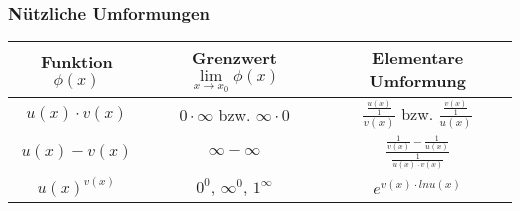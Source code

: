 \subsubsection*{Nützliche Umformungen}
\renewcommand{\arraystretch}{3}
\begin{tabular}{|c|c|c|}
\hline 
\rule[-1ex]{0pt}{2.5ex} Funktion $\phi(x)$ & Grenzwert $\lim\limits_{x \rightarrow x_0} \phi(x)$& Elementare Umformung \\ 
\hline
\rule[-1ex]{0pt}{2.5ex} $u(x) \cdot v(x)$ & $0 \cdot \infty$ bzw. $\infty \cdot 0$ & {\Large $\frac{\frac{u(x)}{1}}{v(x)}$} bzw. {\Large $\frac{\frac{v(x)}{1}}{u(x)}$} \\ 
\hline 
\rule[-1ex]{0pt}{2.5ex} $u(x) - v(x)$ &$\infty - \infty$ & {\Large $\frac{\frac{1}{v(x)}-\frac{1}{u(x)}}{\frac{1}{u(x) \cdot v(x)}}$} \\ 
\hline 
\rule[-1ex]{0pt}{2.5ex} $u(x)^{v(x)}$ & $0^0$, $\infty^0$, $1^\infty$ & $e^{v(x) \cdot ln u(x)}$ \\ 
\hline 
\end{tabular} 
